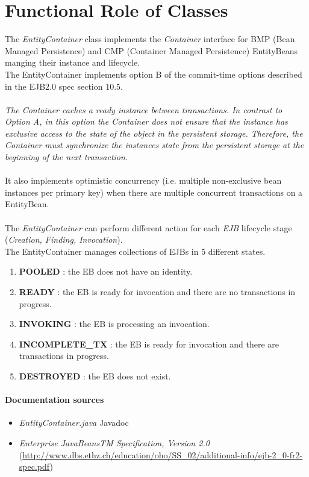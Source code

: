 \section{Functional Role of Classes} %
\label{sec:functional_role_of_classes}

The \emph{EntityContainer} class implements the \emph{Container} interface for BMP (Bean Managed Persistence) and CMP (Container Managed Persistence) EntityBeans manging their instance and lifecycle.\\
The EntityContainer implements option B of the commit-time options
 described in the EJB2.0 spec section 10.5.\\\\
 \emph{The Container caches a \emph{ready} instance between transactions. In contrast to Option
A, in this option the Container does not ensure that the instance has exclusive access to the
state of the object in the persistent storage. Therefore, the Container must synchronize the
instances state from the persistent storage at the beginning of the next transaction.}\\\\
It also implements optimistic concurrency (i.e. multiple non-exclusive bean instances per primary key) when there are multiple concurrent transactions on a EntityBean.
\\\\
The \emph{EntityContainer} can perform different action for each \emph{EJB} lifecycle stage (\emph{Creation, Finding, Invocation}).\\

The EntityContainer manages collections of EJBs
in  5 different states.
\begin{enumerate}
	\item \textbf{POOLED} : the EB does not have an identity.
	\item \textbf{READY} : the EB is ready for invocation and there are no transactions in progress.
	\item \textbf{INVOKING} : the EB is processing an invocation.
	\item \textbf{INCOMPLETE\_TX} : the EB is ready for invocation and there are transactions in progress.
	\item \textbf{DESTROYED} : the EB does not exist.
\end{enumerate}

\paragraph{Documentation sources} %
\label{par:documentation_sources}
\begin{itemize}
	\item \emph{EntityContainer.java} Javadoc
	\item \emph{Enterprise JavaBeansTM Specification,
Version 2.0} (\url{http://www.dbs.ethz.ch/education/oho/SS_02/additional-info/ejb-2_0-fr2-spec.pdf})
\end{itemize}

